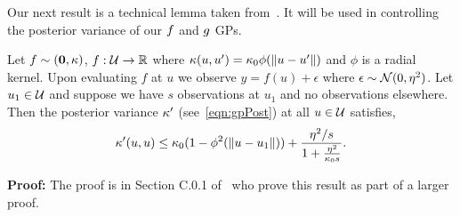Our next result is a technical lemma taken from~\citet{kandasamy16mfbo}.
It will be used in controlling
the posterior variance of our $f$ and $g$ GPs.

\begin{lemma}
\label{lem:varbound}
Let $f\sim({\bf 0},\kappa)$, $f:\mathcal{U}\rightarrow\mathbb{R}$ where
$\kappa(u,u') = \kappa_0\phi(\|u-u'\|)$ and
$\phi$ is a radial kernel.
Upon evaluating $f$ at $u$ we observe $y = f(u) + \epsilon$ where
$\epsilon\sim\mathcal{N}(0,\eta^2)$.
Let $u_1\in\mathcal{U}$ and suppose we have $s$ observations at $u_1$ and no observations
elsewhere.
Then the posterior variance $\kappa'$ (see~\eqref{eqn:gpPost}) at all $u\in\mathcal{U}$
satisfies,
\[
\kappa'(u,u) \leq \kappa_0(1-\phi^2(\|u-u_1\|)) + \frac{\eta^2/s}{ 1+
\frac{\eta^2}{\kappa_0 s}}.
\]
\end{lemma}
\textbf{Proof:}
The proof is in Section C.0.1 of~\citet{kandasamy16mfbo} who
prove this result as part of a larger proof.
\hfill\BlackBox


